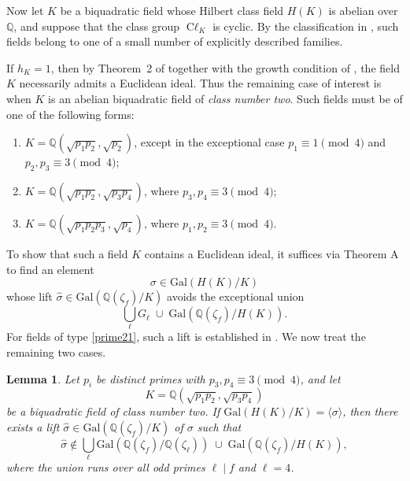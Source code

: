 \documentclass[12 pt]{amsart}
\newcommand{\Q}{\mathbb{Q}}
\newcommand\Gal{{\mathrm {Gal}}}
\newtheorem{lemma}[thm]{Lemma}
\theoremstyle{definition}
\theoremstyle{remark}
\DeclareMathOperator{\Cl}{C\ell}
\begin{document}
Now let $K$ be a biquadratic field whose Hilbert class field $H(K)$ is 
abelian over $\Q$, and suppose that the class group $\Cl_K$ is cyclic.
By the classification in , such fields
belong to one of a small number of explicitly described families.

If $h_K=1$, then by Theorem~2 of \cite{Gra11} together with the growth
condition of \cite{Gra13}, the field $K$ necessarily admits a Euclidean
ideal.  
Thus the remaining case of interest is when $K$ is an abelian biquadratic
field of \emph{class number two}.  
Such fields must be of one of the following forms:
\begin{enumerate}
    \item $K=\Q(\sqrt{p_1p_2},\sqrt{p_2})$, except in the exceptional case
    $p_1\equiv1\pmod4$ and $p_2,p_3\equiv3\pmod4$; \label{prime21}
    \item $K=\Q(\sqrt{p_1p_2},\sqrt{p_3p_4})$, where $p_3,p_4\equiv3\pmod4$; 
    \label{prime22}
    \item $K=\Q(\sqrt{p_1p_2p_3},\sqrt{p_4})$, where $p_1,p_2\equiv3\pmod4$. 
    \label{primes31}
\end{enumerate}

To show that such a field $K$ contains a Euclidean ideal, it suffices via  Theorem A to find an element
\[
\sigma\in\Gal(H(K)/K)
\]
whose lift $\hat{\sigma}\in\Gal(\Q(\zeta_f)/K)$ avoids the exceptional union
\[
\bigcup_{\ell}G_\ell\;\cup\;\Gal(\Q(\zeta_f)/H(K)).
\]
For fields of type \cref{prime21}, such a lift is established in
\cite[Lemma~4.2]{KrPa25}.  
We now treat the remaining two cases.

\begin{lemma}\label{existence_of_lift3}
Let $p_i$ be distinct primes with $p_3,p_4\equiv3\pmod4$, and let
\[
K=\Q(\sqrt{p_1p_2},\sqrt{p_3p_4})
\]
be a biquadratic field of class number two.  
If $\Gal(H(K)/K)=\langle\sigma\rangle$, then there exists a lift
$\hat{\sigma}\in\Gal(\Q(\zeta_f)/K)$ of $\sigma$ such that
\[
\hat{\sigma}\notin 
\bigcup_{\ell} \Gal(\Q(\zeta_f)/\Q(\zeta_\ell))
\;\cup\;
\Gal(\Q(\zeta_f)/H(K)),
\]
where the union runs over all odd primes $\ell\mid f$ and $\ell=4$.
\end{lemma}
\end{document}
